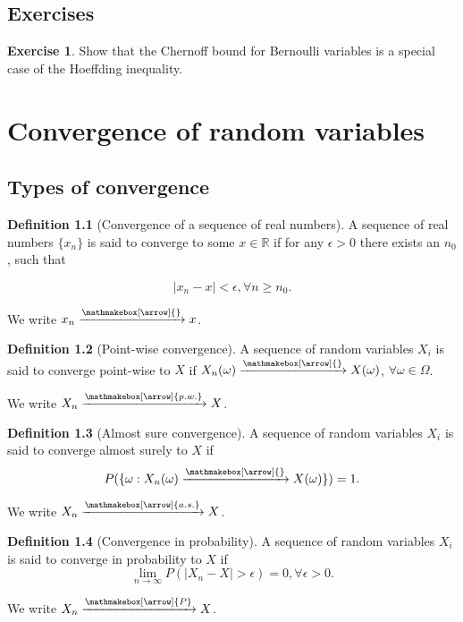 \documentclass{book}
\theoremstyle{plain}%
\theoremstyle{definition}
\newtheorem{definition}{Definition}[section]
\newtheorem{exercise}{Exercise}[chapter]
\newlength{\arrow}
\newcommand*{\myrightarrow}[1]{\xrightarrow{\mathmakebox[\arrow]{#1}}}
\begin{document}
\section*{Exercises}

\begin{exercise}
Show that the Chernoff bound for Bernoulli variables is a special case of the Hoeffding inequality.
\end{exercise}



\chapter{Convergence of random variables}

\section{Types of convergence}

\begin{definition}[Convergence of a sequence of real numbers]

A sequence of real numbers $\{x_n\}$ is said to converge to some $x \in \mathbb{R}$ if for any $\epsilon > 0$ there exists an $n_0$, such that 

$$|x_n - x| < \epsilon, \forall n \geq n_0.$$

We write $x_n \myrightarrow{} x$.
\end{definition}

\begin{definition}[Point-wise convergence]
A sequence of random variables ${X_i}$ is said to converge point-wise to $X$ if $X_n(\omega) \myrightarrow{}  X(\omega)$, $\forall \omega \in \Omega$.

We write $X_n \myrightarrow{p.w.} X$.
\end{definition}

\begin{definition}[Almost sure convergence]
A sequence of random variables ${X_i}$ is said to converge almost surely to $X$ if $$P(\{\omega: X_n(\omega) \myrightarrow{} X(\omega)\}) = 1 .$$

We write $X_n \myrightarrow{a.s.} X$.
\end{definition}

\begin{definition}[Convergence in probability]
A sequence of random variables ${X_i}$ is said to converge in probability to $X$ if $$\lim_{n \rightarrow \infty} P(|X_n - X| > \epsilon) = 0, \forall \epsilon > 0.$$

We write $X_n \myrightarrow{P} X$.
\end{definition}
\end{document}
